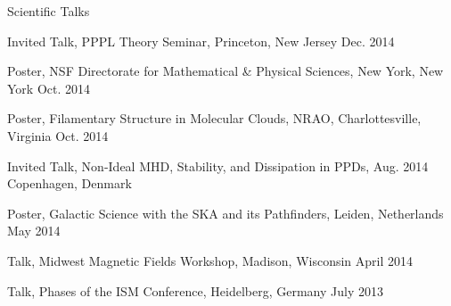 \documentclass{resume_clark} %
\begin{document}
\begin{rSection}{Scientific Talks}
\begin{etaremune}[itemsep=-1.8mm]
\item Invited Talk, PPPL Theory Seminar, Princeton, New Jersey \hfill {Dec. 2014}

\item Poster, NSF Directorate for Mathematical \& Physical Sciences, New York, New York \hfill {Oct. 2014}

\item Poster, Filamentary Structure in Molecular Clouds, NRAO, Charlottesville, Virginia \hfill {Oct. 2014}

\item Invited Talk, Non-Ideal MHD, Stability, and Dissipation in PPDs, \hfill {Aug. 2014} \\ Copenhagen, Denmark 

\item Poster, Galactic Science with the SKA and its Pathfinders, Leiden, Netherlands \hfill {May 2014}

\item Talk, Midwest Magnetic Fields Workshop, Madison, Wisconsin \hfill {April 2014}

\item Talk, Phases of the ISM Conference, Heidelberg, Germany \hfill {July 2013}


\end{etaremune}
\end{rSection}
\end{document}
